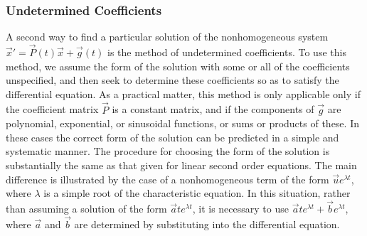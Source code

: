 \documentclass[10pt]{report}
\begin{document}
\subsubsection{Undetermined Coefficients}
A second way to find a particular solution of the nonhomogeneous system $\vec{x}' = \vec{P}(t)\vec{x} + \vec{g}(t)$ is the method of undetermined coefficients. To use this method, we assume the form of the solution with some or all of the coefficients unspecified, and then seek to determine these coefficients so as to satisfy the differential equation. As a practical matter, this method is only applicable only if the coefficient matrix $\vec{P}$ is a constant matrix, and if the components of $\vec{g}$ are polynomial, exponential, or sinusoidal functions, or sums or products of these. In these cases the correct form of the solution can be predicted in a simple and systematic manner. The procedure for choosing the form of the solution is substantially the same as that given for linear second order equations. The main difference is illustrated by the case of a nonhomogeneous term of the form $\vec{u}e^{\lambda t}$, where $\lambda$ is a simple root of the characteristic equation. In this situation, rather than assuming a solution of the form $\vec{a}te^{\lambda t}$, it is necessary to use $\vec{a}te^{\lambda t} + \vec{b}e^{\lambda t}$, where $\vec{a}$ and $\vec{b}$ are determined by substituting into the differential equation.
\end{document}
